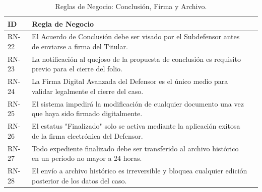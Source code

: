 \begin{table}[h!]
\centering
\scriptsize
\caption{Reglas de Negocio: Conclusión, Firma y Archivo.}
\label{tab:rn_cierre}
\begin{tabular}{@{} l p{9.5cm} l @{}}
\toprule
\rowcolor[HTML]{2D3E50} 
\textbf{\color[HTML]{FFFFFF} ID} & \textbf{\color[HTML]{FFFFFF} Regla de Negocio} \\ \midrule
RN-22 & El Acuerdo de Conclusión debe ser visado por el Subdefensor antes de enviarse a firma del Titular. \\
\rowcolor[HTML]{F2F4F7} 
RN-23 & La notificación al quejoso de la propuesta de conclusión es requisito previo para el cierre del folio. \\
RN-24 & La Firma Digital Avanzada del Defensor es el único medio para validar legalmente el cierre del caso. \\
\rowcolor[HTML]{F2F4F7} 
RN-25 & El sistema impedirá la modificación de cualquier documento una vez que haya sido firmado digitalmente. \\
RN-26 & El estatus "Finalizado" solo se activa mediante la aplicación exitosa de la firma electrónica del Defensor. \\
\rowcolor[HTML]{F2F4F7} 
RN-27 & Todo expediente finalizado debe ser transferido al archivo histórico en un periodo no mayor a 24 horas. \\
RN-28 & El envío a archivo histórico es irreversible y bloquea cualquier edición posterior de los datos del caso. \\ \bottomrule
\end{tabular}
\end{table}


